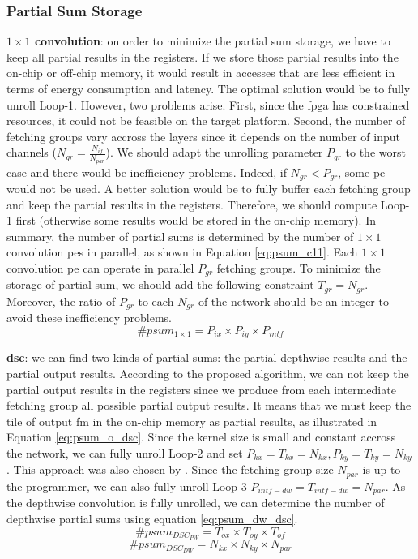 \subsubsection{Partial Sum Storage}
%
\textbf{$1 \times 1$ convolution}: on order to minimize the partial sum storage, we have to keep all partial results in the registers. If we store those partial results into the on-chip or off-chip memory, it would result in accesses that are less efficient in terms of energy consumption and latency. The optimal solution would be to fully unroll Loop-1. However, two problems arise. First, since the \acrshort{fpga} has constrained resources, it could not be feasible on the target platform. Second, the number of fetching groups vary accross the layers since it depends on the number of input channels ($N_{gr} = \frac{N_{if}}{N_{par}}$). We should adapt the unrolling parameter $P_{gr}$ to the worst case and there would be inefficiency problems. Indeed, if $N_{gr} < P_{gr}$, some \acrshort{pe} would not be used. A better solution would be to fully buffer each fetching group and keep the partial results in the registers. Therefore, we should compute Loop-1 first (otherwise some results would be stored in the on-chip memory).
In summary, the number of partial sums is determined by the number of $1 \times 1$ convolution \acrshort{pe}s in parallel, as shown in Equation \eqref{eq:psum_c11}. Each $1 \times 1$ convolution \acrshort{pe} can operate in parallel $P_{gr}$ fetching groups. To minimize the storage of partial sum, we should add the following constraint $T_{gr} = N_{gr}$. Moreover, the ratio of $P_{gr}$ to each $N_{gr}$ of the network should be an integer to avoid these inefficiency problems.
%
\begin{equation}
    \# psum_{1 \times 1} = P_{ix} \times P_{iy} \times P_{intf}
    \label{eq:psum_c11}
\end{equation}

\textbf{\acrshort{dsc}}: we can find two kinds of partial sums: the partial depthwise results and the partial output results. According to the proposed algorithm, we can not keep the partial output results in the registers since we produce from each intermediate fetching group all possible partial output results. It means that we must keep the tile of output \acrshort{fm} in the on-chip memory as partial results, as illustrated in Equation \eqref{eq:psum_o_dsc}. Since the kernel size is small and constant accross the network, we can fully unroll Loop-2 and set $P_{kx} = T_{kx} = N_{kx}, P_{ky} = T_{ky} = N_{ky}$. This approach was also chosen by \textcite{motamedi_placid_2017}. Since the fetching group size $N_{par}$ is up to the programmer, we can also fully unroll Loop-3 $P_{intf-dw} = T_{intf-dw} = N_{par}$. As the depthwise convolution is fully unrolled, we can determine the number of depthwise partial sums using equation \eqref{eq:psum_dw_dsc}.
%
\begin{equation}
    \# psum_{DSC_{PW}} = T_{ox} \times T_{oy} \times T_{of}
    \label{eq:psum_o_dsc}
\end{equation}
%
\begin{equation}
    \# psum_{DSC_{DW}} = N_{kx} \times N_{ky} \times N_{par}
    \label{eq:psum_dw_dsc}
\end{equation}
%
